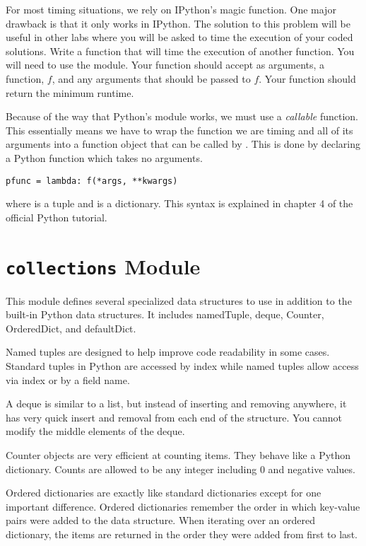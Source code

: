 \begin{problem}
For most timing situations, we rely on IPython's  magic function.
One major drawback is that it only works in IPython.
The solution to this problem will be useful in other labs where you will be asked to time the execution of your coded solutions.
Write a function that will time the execution of another function.
You will need to use the  module.
Your function should accept as arguments, a function, $f$, and any arguments that should be passed to $f$.
Your function should return the minimum runtime.

Because of the way that Python's  module works, we must use a \emph{callable} function.
This essentially means we have to wrap the function we are timing and all of its arguments into a function object that can be called by .
This is done by declaring a Python  function which takes no arguments.
\begin{lstlisting}
pfunc = lambda: f(*args, **kwargs)
\end{lstlisting}
where  is a tuple and  is a dictionary.
This syntax is explained in chapter 4 of the official Python tutorial.
\end{problem}

\section*{\texttt{collections} Module}
This module defines several specialized data structures to use in addition to the built-in Python data structures. It includes namedTuple, deque, Counter, OrderedDict, and defaultDict.

Named tuples are designed to help improve code readability in some cases.
Standard tuples in Python are accessed by index while named tuples allow access via index or by a field name.

A deque is similar to a list, but instead of inserting and removing anywhere, it has very quick insert and removal from each end of the structure.  You cannot modify the middle elements of the deque.
 
Counter objects are very efficient at counting items.  They behave like a Python dictionary.  Counts are allowed to be any integer including 0 and negative values.
 
Ordered dictionaries are exactly like standard dictionaries except for one important difference.
Ordered dictionaries remember the order in which key-value pairs were added to the data structure.
When iterating over an ordered dictionary, the items are returned in the order they were added from first to last.

